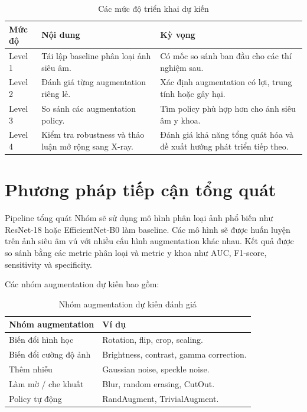 \documentclass[12pt,a4paper]{article}
\begin{document}
\begin{table}[H]
\centering
\caption{Các mức độ triển khai dự kiến}
\renewcommand{\arraystretch}{1.25}
\begin{tabular}{p{2.2cm} p{5.5cm} p{6.5cm}}
\toprule
\textbf{Mức độ} & \textbf{Nội dung} & \textbf{Kỳ vọng} \\
\midrule
Level 1 & Tái lập baseline phân loại ảnh siêu âm. & Có mốc so sánh ban đầu cho các thí nghiệm sau. \\
Level 2 & Đánh giá từng augmentation riêng lẻ. & Xác định augmentation có lợi, trung tính hoặc gây hại. \\
Level 3 & So sánh các augmentation policy. & Tìm policy phù hợp hơn cho ảnh siêu âm y khoa. \\
Level 4 & Kiểm tra robustness và thảo luận mở rộng sang X-ray. & Đánh giá khả năng tổng quát hóa và đề xuất hướng phát triển tiếp theo. \\
\bottomrule
\end{tabular}
\end{table}

\section{Phương pháp tiếp cận tổng quát}

\begin{methodbox}{Pipeline tổng quát}
Nhóm sẽ sử dụng mô hình phân loại ảnh phổ biến như ResNet-18 hoặc EfficientNet-B0 làm baseline. Các mô hình sẽ được huấn luyện trên ảnh siêu âm vú với nhiều cấu hình augmentation khác nhau. Kết quả được so sánh bằng các metric phân loại và metric y khoa như AUC, F1-score, sensitivity và specificity.
\end{methodbox}

Các nhóm augmentation dự kiến bao gồm:

\begin{table}[H]
\centering
\caption{Nhóm augmentation dự kiến đánh giá}
\renewcommand{\arraystretch}{1.2}
\begin{tabular}{p{5cm} p{9.5cm}}
\toprule
\textbf{Nhóm augmentation} & \textbf{Ví dụ} \\
\midrule
Biến đổi hình học & Rotation, flip, crop, scaling. \\
Biến đổi cường độ ảnh & Brightness, contrast, gamma correction. \\
Thêm nhiễu & Gaussian noise, speckle noise. \\
Làm mờ / che khuất & Blur, random erasing, CutOut. \\
Policy tự động & RandAugment, TrivialAugment. \\
\bottomrule
\end{tabular}
\end{table}
\end{document}
